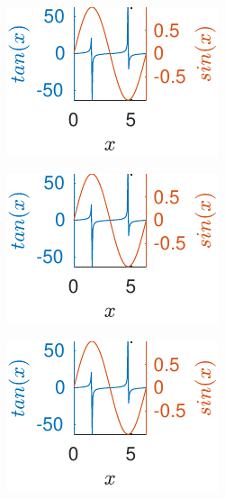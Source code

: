 \begin{figure}[H]
\begin{subfigure}[b]{\fourfig\textwidth}
		\end{subfigure}
		\\
		\begin{subfigure}[b]{\fourfig\textwidth} 
			\includegraphics{../matlab/fig/examples/tansin-with-ffsp.pdf}
		\end{subfigure}
		\hfil
		\begin{subfigure}[b]{\fourfig\textwidth} 
			\includegraphics{../matlab/fig/examples/tansin-with-ffsp.pdf}
		\end{subfigure}
		\hfil
		\begin{subfigure}[b]{\fourfig\textwidth} 
			\centering
			\includegraphics{../matlab/fig/examples/tansin-with-ffsp.pdf}
		\end{subfigure}
		\hfil
		\begin{subfigure}[b]{\fourfig\textwidth} 

\end{subfigure}
\end{figure}
